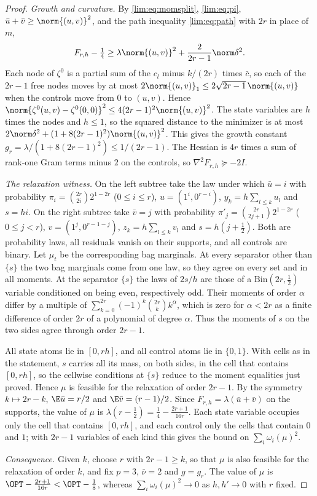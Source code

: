 \begin{proof}
\emph{Growth and curvature.} By \eqref{lim:eq:momsplit}, \eqref{lim:eq:pi},
$\bar u+\bar v\ge\norm{(u,v)}^2$, and the path inequality \eqref{lim:eq:path}
with $2r$ in place of $m$,
\[
F_{r,h}-\tfrac14\ge\lambda\norm{(u,v)}^2+\frac2{2r-1}\norm\delta^2 .
\]
Each node of $\zeta^0$ is a partial sum of the $c_l$ minus $k/(2r)$ times
$\bar c$, so each of the $2r-1$ free nodes moves by at most
$2\norm{(u,v)}_1\le2\sqrt{2r-1}\,\norm{(u,v)}$ when the controls move from
$0$ to $(u,v)$. Hence
$\norm{\zeta^0(u,v)-\zeta^0(0,0)}^2\le4(2r-1)^2\norm{(u,v)}^2$. The state
variables are $h$ times the nodes and $h\le1$, so the squared distance to the
minimizer is at most $2\norm\delta^2+(1+8(2r-1)^2)\norm{(u,v)}^2$. This gives
the growth constant $g_r=\lambda/(1+8(2r-1)^2)\le1/(2r-1)$. The Hessian is $4r$
times a sum of rank-one Gram terms minus $2$ on the controls, so
$\nabla^2F_{r,h}\succeq-2I$.

\emph{The relaxation witness.} On the left subtree take the law under which
$\bar u=i$ with probability $\pi_i=\binom{2r}{2i}2^{1-2r}$ ($0\le i\le r$),
$u=(1^i,0^{r-i})$, $y_k=h\sum_{l\le k}u_l$ and $s=hi$. On the right subtree
take $\bar v=j$ with probability $\pi'_j=\binom{2r}{2j+1}2^{1-2r}$ ($0\le j<r$),
$v=(1^j,0^{r-1-j})$, $z_k=h\sum_{l\le k}v_l$ and $s=h(j+\frac12)$. Both are
probability laws, all residuals vanish on their supports, and all controls are
binary. Let $\mu_t$ be the corresponding bag marginals. At every separator
other than $\{s\}$ the two bag marginals come from one law, so they agree on
every set and in all moments. At the separator $\{s\}$ the laws of $2s/h$ are
those of a $\mathrm{Bin}(2r,\frac12)$ variable conditioned on being even,
respectively odd. Their moments of order $\alpha$ differ by a multiple of
$\sum_{k=0}^{2r}(-1)^k\binom{2r}kk^\alpha$, which is zero for $\alpha<2r$ as a
finite difference of order $2r$ of a polynomial of degree $\alpha$. Thus the
moments of $s$ on the two sides agree through order $2r-1$.

All state atoms lie in $[0,rh]$, and all control atoms lie in $\{0,1\}$. With
cells as in the statement, $s$ carries all its mass, on both sides, in the
cell that contains $[0,rh]$, so the cellwise conditions at $\{s\}$ reduce to
the moment equalities just proved. Hence $\mu$ is feasible for the relaxation
of order $2r-1$. By the symmetry $k\mapsto2r-k$, $\E\bar u=r/2$ and
$\E\bar v=(r-1)/2$. Since $F_{r,h}=\lambda(\bar u+\bar v)$ on the supports,
the value of $\mu$ is $\lambda(r-\frac12)=\frac14-\frac{2r+1}{16r}$. Each state
variable occupies only the cell that contains $[0,rh]$, and each control only
the cells that contain $0$ and $1$; with $2r-1$ variables of each kind this
gives the bound on $\sum_i\omega_i(\mu)^2$.

\emph{Consequence.} Given $k$, choose $r$ with $2r-1\ge k$, so that $\mu$ is
also feasible for the relaxation of order $k$, and fix $p=3$, $\bar\nu=2$ and
$g=g_r$. The value of $\mu$ is $\OPT-\frac{2r+1}{16r}<\OPT-\frac18$, whereas
$\sum_i\omega_i(\mu)^2\to0$ as $h,h'\to0$ with $r$ fixed.
\end{proof}

